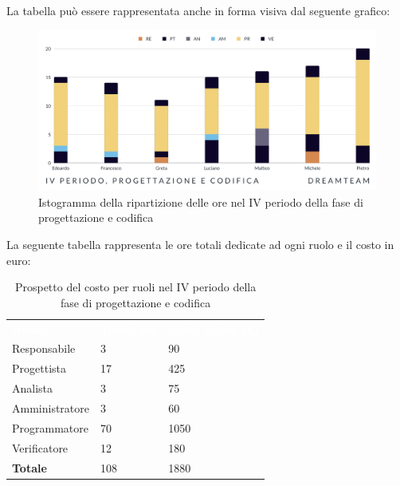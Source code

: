 La tabella può essere rappresentata anche in forma visiva dal seguente grafico:
\begin{figure}[H]
\centering
\includegraphics[scale=0.65]{Sezioni/SezioniPreventivo/grafici/Progettazione_codifica_IV_periodo.png}
\caption{Istogramma della ripartizione delle ore nel IV periodo della fase di progettazione e codifica}
\end{figure}

La seguente tabella rappresenta le ore totali dedicate ad ogni ruolo e il costo in euro:

\begin{table}[H]
\begin{center}
\renewcommand{\arraystretch}{1.5}
\begin{tabular}{ m{}<{\centering}  m{}<{\centering} m{}<{\centering}}
	\rowcolor{darkblue}
	\textcolor{white}{\textbf{Ruolo}}&\textcolor{white}{\textbf{Totale ore}}&\textcolor{white}{\textbf{Costo totale (\euro)}}\\ 

	Responsabile  & 3 & 90 \\	
	
	Progettista & 17 & 425 \\
	
	Analista & 3 & 75 \\

	Amministratore & 3 & 60 \\
	
	Programmatore & 70 & 1050 \\
	
	Verificatore & 12 & 180 \\
	
	\textbf{Totale} & 108 & 1880 \\
	
\end{tabular}
\caption{Prospetto del costo per ruoli nel IV periodo della fase di progettazione e codifica}
\end{center}
\end{table}

